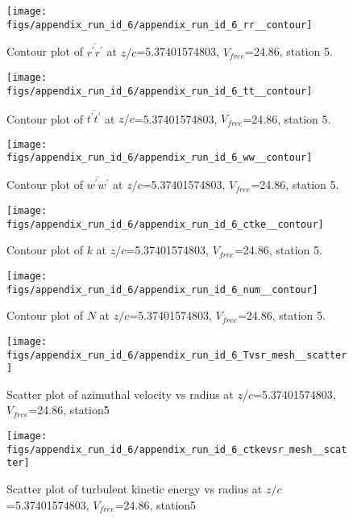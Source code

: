 \begin{figure}[H]
\centering
\texttt{[image: figs/appendix\_run\_id\_6/appendix\_run\_id\_6\_rr\_\_contour]}
\caption{Contour plot of $\overline{r^\prime r^\prime}$ at $z/c$=5.37401574803, $V_{free}$=24.86, station 5.}
\label{fig:appendix_run_id_6_rr__contour}
\end{figure}


\begin{figure}[H]
\centering
\texttt{[image: figs/appendix\_run\_id\_6/appendix\_run\_id\_6\_tt\_\_contour]}
\caption{Contour plot of $\overline{t^\prime t^\prime}$ at $z/c$=5.37401574803, $V_{free}$=24.86, station 5.}
\label{fig:appendix_run_id_6_tt__contour}
\end{figure}


\begin{figure}[H]
\centering
\texttt{[image: figs/appendix\_run\_id\_6/appendix\_run\_id\_6\_ww\_\_contour]}
\caption{Contour plot of $\overline{w^\prime w^\prime}$ at $z/c$=5.37401574803, $V_{free}$=24.86, station 5.}
\label{fig:appendix_run_id_6_ww__contour}
\end{figure}


\begin{figure}[H]
\centering
\texttt{[image: figs/appendix\_run\_id\_6/appendix\_run\_id\_6\_ctke\_\_contour]}
\caption{Contour plot of $k$ at $z/c$=5.37401574803, $V_{free}$=24.86, station 5.}
\label{fig:appendix_run_id_6_ctke__contour}
\end{figure}


\begin{figure}[H]
\centering
\texttt{[image: figs/appendix\_run\_id\_6/appendix\_run\_id\_6\_num\_\_contour]}
\caption{Contour plot of $N$ at $z/c$=5.37401574803, $V_{free}$=24.86, station 5.}
\label{fig:appendix_run_id_6_num__contour}
\end{figure}


\begin{figure}[H]
\centering
\texttt{[image: figs/appendix\_run\_id\_6/appendix\_run\_id\_6\_Tvsr\_mesh\_\_scatter]}
\caption{Scatter plot of azimuthal velocity vs radius at $z/c$=5.37401574803, $V_{free}$=24.86, station5}
\label{fig:appendix_run_id_6_Tvsr_mesh__scatter}
\end{figure}


\begin{figure}[H]
\centering
\texttt{[image: figs/appendix\_run\_id\_6/appendix\_run\_id\_6\_ctkevsr\_mesh\_\_scatter]}
\caption{Scatter plot of turbulent kinetic energy vs radius at $z/c$=5.37401574803, $V_{free}$=24.86, station5}
\label{fig:appendix_run_id_6_ctkevsr_mesh__scatter}
\end{figure}


